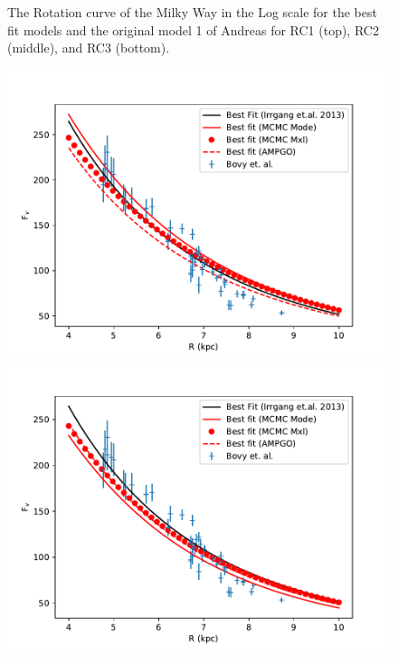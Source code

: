 \documentclass[fleqn,usenatbib]{mnras}
\begin{document}
\begin{figure}
\caption{The Rotation curve of the Milky Way in the Log scale for the best fit models and the original model 1 of Andreas for RC1 (top), RC2 (middle), and RC3 (bottom).
}
\label{fig:Model1_rc}
\end{figure}

\begin{figure}
\includegraphics[width=\columnwidth]{Model_I/Plots/Sofue(2009)/VertForce_ModelI_10000_100.pdf}
\includegraphics[width=\columnwidth]{Model_I/Plots/Sofue(2021)/VertForce_ModelI_10000_100.pdf}

\end{figure}
\end{document}
